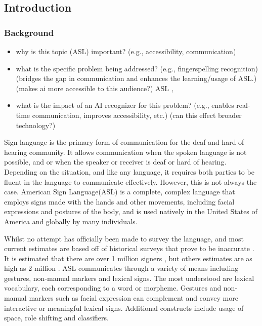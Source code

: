 \subsection{Introduction}
\subsubsection{Background}
\begin{itemize}
    \item why is this topic (ASL) important? (e.g., accessibility, communication)

    \item what is the specific problem being addressed? (e.g., fingerspelling recognition) (bridges the gap in communication and enhances the learning/usage of ASL.) (makes ai more accessible to this audience?)
          ASL ,
    \item what is the impact of an AI recognizer for this problem? (e.g., enables real-time communication, improves accessibility, etc.) (can this effect broader technology?)
\end{itemize}

Sign language is the primary form of communication for the deaf and hard of hearing community. It allows communication when the spoken language is not possible, and or when the speaker or receiver is deaf or hard of hearing.
Depending on the situation, and like any language, it requires both parties to be fluent in the language to communicate effectively. However, this is not always the case. American Sign Language(ASL) is a complete, complex language that employs signs made with the hands and other movements, including facial expressions and postures of the body, and is used natively in the
United States of America and globally by many individuals.

Whilst no attempt has officially been made to survey the language, and most current estimates are based off of historical surveys that prove to be inaccurate \cite{mitchellHowManyPeople2006}. It is estimated that there are over 1 million signers \cite{ethnologueAmericanSignLanguage2023}, but others estimates are as high as 2 million \cite{mitchellHowManyPeople2006}.
ASL communicates through a variety of means including gestures, non-manual markers and lexical signs. The most understood are lexical vocabulary, each corresponding to a word or morpheme. Gestures and non-manual markers such as facial expression can complement and convey more interactive or meaningful lexical signs. Additional constructs include usage of space, role shifting and classifiers.

